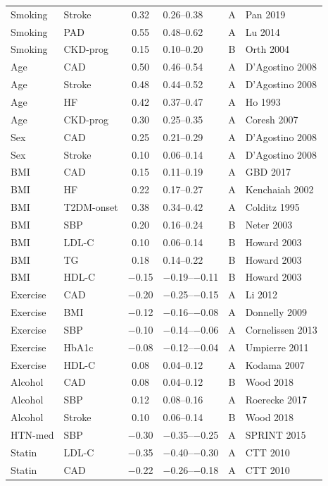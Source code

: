 \documentclass[runningheads]{llncs}
\begin{document}
{\begin{longtable}{@{}p{2.0cm}p{2.0cm}cp{1.4cm}cp{2.8cm}@{}}
Smoking & Stroke & 0.32 & 0.26--0.38 & A & Pan 2019 \\
Smoking & PAD & 0.55 & 0.48--0.62 & A & Lu 2014 \\
Smoking & CKD-prog & 0.15 & 0.10--0.20 & B & Orth 2004 \\
Age & CAD & 0.50 & 0.46--0.54 & A & D'Agostino 2008 \\
Age & Stroke & 0.48 & 0.44--0.52 & A & D'Agostino 2008 \\
Age & HF & 0.42 & 0.37--0.47 & A & Ho 1993 \\
Age & CKD-prog & 0.30 & 0.25--0.35 & A & Coresh 2007 \\
Sex & CAD & 0.25 & 0.21--0.29 & A & D'Agostino 2008 \\
Sex & Stroke & 0.10 & 0.06--0.14 & A & D'Agostino 2008 \\
BMI & CAD & 0.15 & 0.11--0.19 & A & GBD 2017 \\
BMI & HF & 0.22 & 0.17--0.27 & A & Kenchaiah 2002 \\
BMI & T2DM-onset & 0.38 & 0.34--0.42 & A & Colditz 1995 \\
BMI & SBP & 0.20 & 0.16--0.24 & B & Neter 2003 \\
BMI & LDL-C & 0.10 & 0.06--0.14 & B & Howard 2003 \\
BMI & TG & 0.18 & 0.14--0.22 & B & Howard 2003 \\
BMI & HDL-C & $-$0.15 & $-$0.19--$-$0.11 & B & Howard 2003 \\
Exercise & CAD & $-$0.20 & $-$0.25--$-$0.15 & A & Li 2012 \\
Exercise & BMI & $-$0.12 & $-$0.16--$-$0.08 & A & Donnelly 2009 \\
Exercise & SBP & $-$0.10 & $-$0.14--$-$0.06 & A & Cornelissen 2013 \\
Exercise & HbA1c & $-$0.08 & $-$0.12--$-$0.04 & A & Umpierre 2011 \\
Exercise & HDL-C & 0.08 & 0.04--0.12 & A & Kodama 2007 \\
Alcohol & CAD & 0.08 & 0.04--0.12 & B & Wood 2018 \\
Alcohol & SBP & 0.12 & 0.08--0.16 & A & Roerecke 2017 \\
Alcohol & Stroke & 0.10 & 0.06--0.14 & B & Wood 2018 \\
HTN-med & SBP & $-$0.30 & $-$0.35--$-$0.25 & A & SPRINT 2015 \\
Statin & LDL-C & $-$0.35 & $-$0.40--$-$0.30 & A & CTT 2010 \\
Statin & CAD & $-$0.22 & $-$0.26--$-$0.18 & A & CTT 2010 \\

\end{longtable}}
\end{document}
